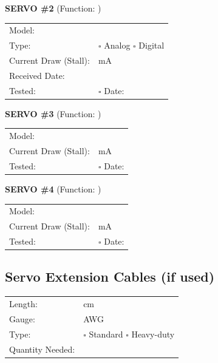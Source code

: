 \documentclass[10pt,letterpaper]{article}
\begin{document}
\textbf{SERVO \#2} (Function: \underline{\hspace{4cm}})
\begin{tabularx}{\textwidth}{lX}
Model: & \underline{\hspace{8cm}} \\
Type: & $\square$ Analog $\square$ Digital \\
Current Draw (Stall): & \underline{\hspace{3cm}} mA \\[0.5em]
Received Date: & \underline{\hspace{4cm}} \\
Tested: & $\square$ \quad Date: \underline{\hspace{3cm}} \\
\end{tabularx}

\vspace{1em}

\textbf{SERVO \#3} (Function: \underline{\hspace{4cm}})
\begin{tabularx}{\textwidth}{lX}
Model: & \underline{\hspace{8cm}} \\
Current Draw (Stall): & \underline{\hspace{3cm}} mA \\
Tested: & $\square$ \quad Date: \underline{\hspace{3cm}} \\
\end{tabularx}

\vspace{1em}

\textbf{SERVO \#4} (Function: \underline{\hspace{4cm}})
\begin{tabularx}{\textwidth}{lX}
Model: & \underline{\hspace{8cm}} \\
Current Draw (Stall): & \underline{\hspace{3cm}} mA \\
Tested: & $\square$ \quad Date: \underline{\hspace{3cm}} \\
\end{tabularx}

\subsection*{Servo Extension Cables (if used)}
\begin{tabularx}{\textwidth}{lX}
Length: & \underline{\hspace{3cm}} cm \\
Gauge: & \underline{\hspace{3cm}} AWG \\
Type: & $\square$ Standard $\square$ Heavy-duty \\
Quantity Needed: & \underline{\hspace{3cm}} \\
\end{tabularx}
\end{document}
